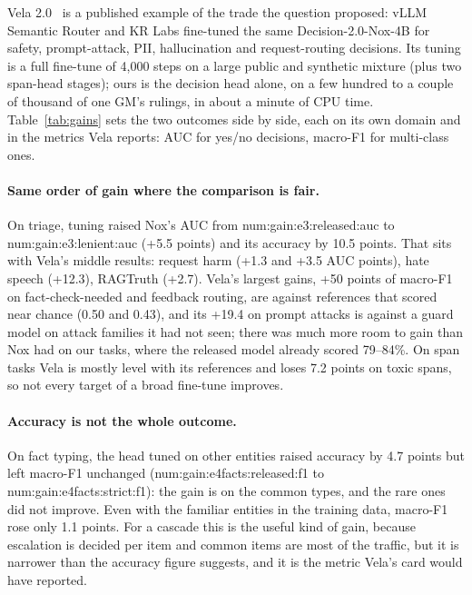 \documentclass[11pt]{article}
\newcommand{\N}[1]{\csname num:#1\endcsname}
\begin{document}
Vela 2.0~\cite{vela2} is a published example of the trade the question proposed: vLLM Semantic Router
and KR Labs fine-tuned the same Decision-2.0-Nox-4B for safety, prompt-attack, PII, hallucination and
request-routing decisions. Its tuning is a full fine-tune of 4{,}000 steps on a large public and
synthetic mixture (plus two span-head stages); ours is the decision head alone, on a few hundred to a
couple of thousand of one GM's rulings, in about a minute of CPU time. Table~\ref{tab:gains} sets the
two outcomes side by side, each on its own domain and in the metrics Vela reports: AUC for yes/no
decisions, macro-F1 for multi-class ones.

\begin{table}[t]
\centering
\small
\setlength{\tabcolsep}{4pt}
\resizebox{\textwidth}{!}{}
\caption{What tuning bought on the tuned-for domain. Tuned Nox: this study, Nox alone, from the
cross-fitted held-out probabilities (no item scored by a head that saw its label); ``before'' is the
released Nox. $^\ddagger$Vela 2.0 4B: as published in its evaluation card~\cite{vela2} (revision
\texttt{d692394}), not re-measured; ``before'' is the per-task reference model the card compares
against (an earlier specialist, a guard model or a span detector), not Nox, whose scores on these
tasks are not published. $\Delta$ in points ($\times 100$ for AUC and F1); Vela's intervals are the
card's paired 95\% CIs.}
\label{tab:gains}
\end{table}

\paragraph{Same order of gain where the comparison is fair.} On triage, tuning raised Nox's AUC from
\N{gain:e3:released:auc} to \N{gain:e3:lenient:auc} (+5.5 points) and its accuracy by 10.5 points.
That sits with Vela's middle results: request harm (+1.3 and +3.5 AUC points), hate speech (+12.3),
RAGTruth (+2.7). Vela's largest gains, +50 points of macro-F1 on fact-check-needed and feedback
routing, are against references that scored near chance (0.50 and 0.43), and its +19.4 on prompt
attacks is against a guard model on attack families it had not seen; there was much more room to
gain than Nox had on our tasks, where the released model already scored 79--84\%. On span tasks Vela
is mostly level with its references and loses 7.2 points on toxic spans, so not every target of a
broad fine-tune improves.

\paragraph{Accuracy is not the whole outcome.} On fact typing, the head tuned on other entities
raised accuracy by 4.7 points but left macro-F1 unchanged (\N{gain:e4facts:released:f1} to
\N{gain:e4facts:strict:f1}): the gain is on the common types, and the rare ones did not improve.
Even with the familiar entities in the training data, macro-F1 rose only 1.1 points. For a
cascade this is the useful kind of gain, because escalation is decided per item and common items
are most of the traffic, but it is narrower than the accuracy figure suggests, and it is the
metric Vela's card would have reported.
\end{document}
